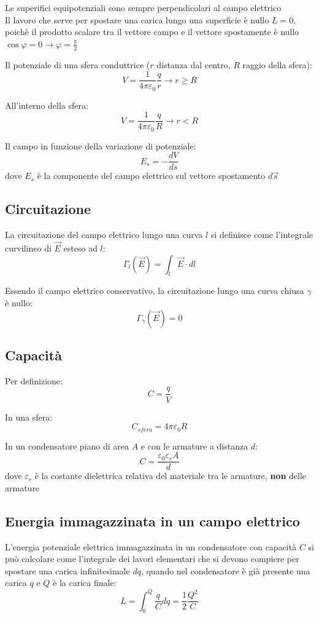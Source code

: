 \documentclass[12pt]{article}
\begin{document}
\vspace{1em}

Le superifici equipotenziali sono sempre perpendicolari al campo elettrico \\
Il lavoro che serve per spostare una carica lungo una superficie è nullo $L = 0$, poichè il prodotto scalare tra il vettore campo e il vettore spostamente è nullo $\cos{\varphi} = 0 \rightarrow \varphi = \frac{\pi}{2}$

\vspace{1em}

Il potenziale di una sfera conduttrice ($r$ distanza dal centro, $R$ raggio della sfera):
$$ V = \frac{1}{4\pi\varepsilon_0}\frac{q}{r} \longrightarrow r \ge R $$

All'interno della sfera:
$$ V = \frac{1}{4\pi\varepsilon_0}\frac{q}{R} \longrightarrow r < R $$

Il campo in funzione della variazione di potenziale:
$$ E_s = -\frac{dV}{ds} $$
dove $E_s$ è la componente del campo elettrico sul vettore spostamento $d\vec{s}$

\subsection{Circuitazione}
La circuitazione del campo elettrico lungo una curva $l$ si definisce come l'integrale curvilineo di $\vec{E}$ esteso ad $l$:
$$ \Gamma_{l}(\vec{E}) = \int_{l} \vec{E}\cdot dl$$

Essendo il campo elettrico conservativo, la circuitazione lungo una curva chiusa $\gamma$ è nullo:
$$ \Gamma_{\gamma}(\vec{E}) = 0 $$

\subsection{Capacità}
Per definizione:
$$ C = \frac{q}{V} $$

In una sfera:
$$ C_{sfera} = 4\pi\varepsilon_0 R $$

In un condensatore piano di area $A$ e con le armature a distanza $d$:
$$ C = \frac{\varepsilon_0 \varepsilon_r A}{d} $$
dove $\varepsilon_r$ è la costante dielettrica relativa del materiale tra le armature, \textbf{non} delle armature

\subsection{Energia immagazzinata in un campo elettrico}
L'energia potenziale elettrica immagazzinata in un condensatore con capacità $C$ si può calcolare come l'integrale dei lavori elementari che si devono compiere per spostare una carica infinitesimale $dq$, quando nel condensatore è già presente una carica $q$ e $Q$ è la carica finale:
$$ L = \int_0^Q \frac{q}{C} dq = \frac{1}{2}\frac{Q^2}{C} $$
\end{document}
